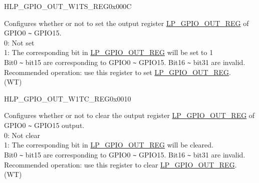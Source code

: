 \begin{register}{H}{LP\_GPIO\_OUT\_W1TS\_REG}{0x000C}\label{regdesc:LPGPIOOUTW1TSREG}
%
%
\regnewline%
\begin{regdesc}\begin{reglist}
\label{fielddesc:LPGPIOOUTDATAW1TS}\item [LP\_GPIO\_OUT\_DATA\_W1TS] Configures whether or not to set the output register \hyperref[regdesc:LPGPIOOUTREG]{LP\_GPIO\_OUT\_REG} of GPIO0 \verb+~+ GPIO15.\\
0: Not set\\
1: The corresponding bit in \hyperref[regdesc:LPGPIOOUTREG]{LP\_GPIO\_OUT\_REG} will be set to 1\\
Bit0 \verb+~+ bit15 are corresponding to GPIO0 \verb+~+ GPIO15. Bit16 \verb+~+ bit31 are invalid.
Recommended operation: use this register to set \hyperref[regdesc:LPGPIOOUTREG]{LP\_GPIO\_OUT\_REG}. \\
(WT)
\end{reglist}\end{regdesc}
\end{register}


\begin{register}{H}{LP\_GPIO\_OUT\_W1TC\_REG}{0x0010}\label{regdesc:LPGPIOOUTW1TCREG}
%
%
\regnewline%
\begin{regdesc}\begin{reglist}
\label{fielddesc:LPGPIOOUTDATAW1TC}\item [LP\_GPIO\_OUT\_DATA\_W1TC] Configures whether or not to clear the output register \hyperref[regdesc:LPGPIOOUTREG]{LP\_GPIO\_OUT\_REG} of GPIO0 \verb+~+ GPIO15 output.\\
0: Not clear\\
1: The corresponding bit in \hyperref[regdesc:LPGPIOOUTREG]{LP\_GPIO\_OUT\_REG} will be cleared.\\
Bit0 \verb+~+ bit15 are corresponding to GPIO0 \verb+~+ GPIO15. Bit16 \verb+~+ bit31 are invalid.
Recommended operation: use this register to clear \hyperref[regdesc:LPGPIOOUTREG]{LP\_GPIO\_OUT\_REG}. \\
(WT)
\end{reglist}\end{regdesc}
\end{register}


